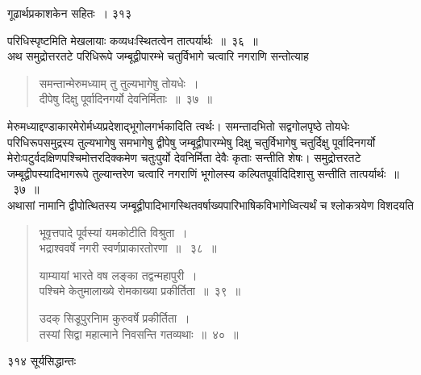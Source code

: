 \documentclass[11pt, openany]{book}
\begin{document}
\newpage


\hspace{3cm} गूढार्थप्रकाशकेन सहितः~। \hfill ३१३
\vspace{1cm}


\noindent परिधिस्पृष्टमिति मेखलायाः कव्यधःस्थितत्वेन तात्पर्यार्थः~॥~३६~॥\\
\noindent अथ समुद्रोत्तरतटे परिधिरूपे जम्बूद्वीपारम्भे चतुर्विभागे चत्वारि नगराणि सन्तोत्याह \textendash

 \begin{quote}
{\ssi समन्तान्मेरुमध्याम् तु तुल्यभागेषु तोयधेः~। \\
दीपेषु दिक्षु पूर्वादिनगर्यो देवनिर्मिताः~॥~३७~॥}
\end{quote}

 मेरुमध्याद्दण्डाकारमेरोर्मध्यप्रदेशाद्भूगोलगर्भकादिति त्वर्थः। समन्तादभितो सद्वगोलपृष्ठे तोयधेः परिधिरूपसमुद्रस्य तुल्यभागेषु समभागेषु द्वीपेषु जम्बूद्वीपारम्भेषु दिक्षु चतुर्विभागेषु चतुर्दिक्षु पूर्वादिनगर्यो मेरोःपटुर्वदक्षिणपश्चिमोत्तरदिक्कमेण चतुःपुर्यो देवनिर्मिता देवैः कृताः सन्तीति शेषः। समुद्रोत्तरतटे जम्बूद्वीपस्यादिभागरूपे तुल्यान्तरेण चत्वारि नगराणिं भूगोलस्य कल्पितपूर्वादिदिशासु सन्तीति तात्पर्यार्थः~॥~३७~॥ \\
\noindent अथासां नामानि द्वीपोत्थितस्य जम्बूद्वीपादिभागस्थितवर्षाख्यपारिभाषिकविभागेध्वित्यर्थं च श्लोकत्रयेण विशदयति \textendash

 \begin{quote}
{\ssi भूवृत्तपादे पूर्वस्यां यमकोटीति विश्रुता~।\\
भद्राश्ववर्षे नगरी स्वर्णप्राकारतोरणा~॥~ ३८~॥

याम्यायां भारते वष लङ्का तद्वन्महापुरी~।\\
पश्चिमे केतुमालाख्ये रोमकाख्या प्रकीर्तिता~॥~३९~॥

उदक् सिडूपुरनिाम कुरुवर्षे प्रकीर्तिता~।\\
तस्यां सिद्वा महात्माने निवसन्ति गतव्यथाः~॥~४०~॥}
\end{quote}
%


\newpage

\noindent ३१४ \hspace{4cm} सूर्यसिद्धान्तः
\vspace{1cm}
\end{document}
